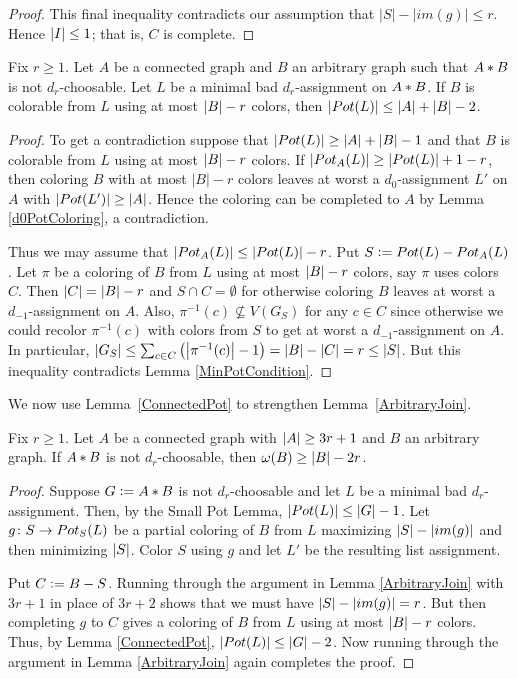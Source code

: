 \begin{proof}
This final inequality contradicts our assumption that $|S|-|im(g)|\le r$. Hence $\left|I\right| \leq 1$; that is, $C$ is complete.
\end{proof}

\begin{lem}\label{ConnectedPot}
Fix $r \geq 1$. Let $A$ be a connected graph and $B$ an arbitrary graph such that $A \mbox{\hspace{2 pt}$\ast$\hspace{2 pt}} B$ is not $d_r$-choosable.  
Let $L$ be a minimal bad $d_r$-assignment on $A \mbox{\hspace{2 pt}$\ast$\hspace{2 pt}} B$.  If $B$ is colorable
from $L$ using at most $\left|B\right| - r$ colors, then $\left|Pot(L)\right| \leq \left|A\right| + \left|B\right| - 2$.
\end{lem}
\begin{proof}
To get a contradiction suppose that $\left|Pot(L)\right| \geq \left|A\right| + \left|B\right| - 1$
and that $B$ is colorable from $L$ using at most $\left|B\right| - r$ colors.  If
$\left|Pot_A(L)\right| \geq \left|Pot(L)\right| + 1 - r$, then coloring $B$ with at most
$|B|-r$ colors leaves at worst a $d_0$-assignment $L'$ on $A$ with $\left|Pot(L')\right| \geq \left|A\right|$.  Hence the coloring can be completed to $A$ by Lemma \ref{d0PotColoring}, a contradiction.

Thus we may assume that $\left|Pot_A(L)\right| \leq \left|Pot(L)\right| - r$. Put
$S\mathrel{\mathop:}= Pot(L) - Pot_A(L)$.  Let $\pi$ be a coloring of $B$ from $L$ using
at most $\left|B\right| - r$ colors, say $\pi$ uses colors $C$. Then $\left|C\right| =
\left|B\right| - r$ and $S \cap C = \emptyset$ for otherwise coloring $B$ leaves at
worst a $d_{-1}$-assignment on $A$.  Also, $\pi^{-1}(c) \not \subseteq V(G_S)$
for any $c \in C$ since otherwise we could recolor $\pi^{-1}(c)$ with colors
from $S$ to get at worst a $d_{-1}$-assignment on $A$.  In particular,
$\left|G_S\right| \leq \sum_{c \in C} \left(\left|\pi^{-1}(c)\right| - 1\right) =
\left|B\right|-\left|C\right| = r \leq \left|S\right|$.  But
this inequality contradicts Lemma \ref{MinPotCondition}.
\end{proof}

We now use Lemma~\ref{ConnectedPot} to strengthen Lemma~\ref{ArbitraryJoin}.

\begin{lem}\label{ConnectedJoin}
Fix $r \geq 1$.  Let $A$ be a connected graph with $\left|A\right| \geq 3r+1$ and $B$ an arbitrary graph.  If $A \mbox{\hspace{2 pt}$\ast$\hspace{2 pt}} B$ is not $d_r$-choosable, then
$\omega(B) \geq \left|B\right| - 2r$.
\end{lem}
\begin{proof}
Suppose $G \mathrel{\mathop:}= A \mbox{\hspace{2 pt}$\ast$\hspace{2 pt}} B$ is not $d_r$-choosable and let $L$ be a minimal bad $d_r$-assignment. Then, by the Small Pot Lemma, $\left|Pot(L)\right| \leq \left|G\right| - 1$.  Let $g\colon S \rightarrow Pot_S(L)$ be a partial coloring of $B$ from $L$ maximizing $\left|S\right| - \left|im(g)\right|$ and then minimizing $\left|S\right|$.  Color $S$ using $g$ and let $L'$ be the resulting list assignment. 

Put $C \mathrel{\mathop:}= B - S$. Running through the argument in Lemma \ref{ArbitraryJoin} with $3r+1$ in place of $3r+2$ shows that we must have $\left|S\right| - \left|im(g)\right| = r$. But then completing $g$ to $C$ gives a coloring of $B$ from $L$ using at most $\left|B\right| - r$ colors.  Thus, by Lemma \ref{ConnectedPot}, $\left|Pot(L)\right| \leq \left|G\right| - 2$.  Now running through the argument in Lemma \ref{ArbitraryJoin} again completes the proof.
\end{proof}

